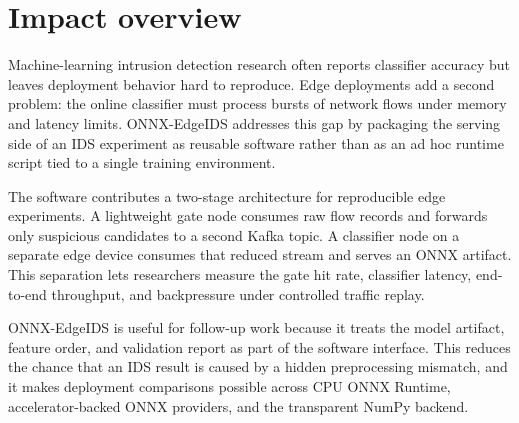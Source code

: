 \section{Impact overview}

Machine-learning intrusion detection research often reports classifier accuracy but leaves deployment behavior hard to reproduce. Edge deployments add a second problem: the online classifier must process bursts of network flows under memory and latency limits. ONNX-EdgeIDS addresses this gap by packaging the serving side of an IDS experiment as reusable software rather than as an ad hoc runtime script tied to a single training environment.

The software contributes a two-stage architecture for reproducible edge experiments. A lightweight gate node consumes raw flow records and forwards only suspicious candidates to a second Kafka topic. A classifier node on a separate edge device consumes that reduced stream and serves an ONNX artifact. This separation lets researchers measure the gate hit rate, classifier latency, end-to-end throughput, and backpressure under controlled traffic replay.

ONNX-EdgeIDS is useful for follow-up work because it treats the model artifact, feature order, and validation report as part of the software interface. This reduces the chance that an IDS result is caused by a hidden preprocessing mismatch, and it makes deployment comparisons possible across CPU ONNX Runtime, accelerator-backed ONNX providers, and the transparent NumPy backend.
